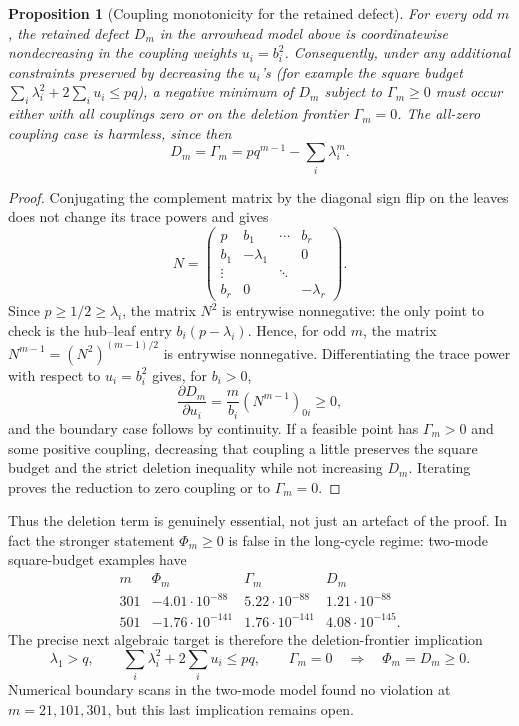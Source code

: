 \documentclass[11pt]{article}
\newtheorem{proposition}[theorem]{Proposition}
\begin{document}
\begin{proposition}[Coupling monotonicity for the retained defect]\label{prop:retained-monotone}
For every odd $m$, the retained defect $D_m$ in the arrowhead model above is coordinatewise nondecreasing in the coupling weights $u_i=b_i^2$.  Consequently, under any additional constraints preserved by decreasing the $u_i$'s (for example the square budget $\sum_i\lambda_i^2+2\sum_i u_i\le pq$), a negative minimum of $D_m$ subject to $\Gamma_m\ge0$ must occur either with all couplings zero or on the deletion frontier $\Gamma_m=0$.  The all-zero coupling case is harmless, since then
\[
        D_m=\Gamma_m=pq^{m-1}-\sum_i\lambda_i^m .
\]
\end{proposition}

\begin{proof}
Conjugating the complement matrix by the diagonal sign flip on the leaves does not change its trace powers and gives
\[
        N=
        \begin{pmatrix}
        p&b_1&\cdots&b_r\\
        b_1&-\lambda_1&&0\\
        \vdots&&\ddots&\\
        b_r&0&&-\lambda_r
        \end{pmatrix}.
\]
Since $p\ge1/2\ge\lambda_i$, the matrix $N^2$ is entrywise nonnegative: the only point to check is the hub--leaf entry $b_i(p-\lambda_i)$.  Hence, for odd $m$, the matrix $N^{m-1}=(N^2)^{(m-1)/2}$ is entrywise nonnegative.  Differentiating the trace power with respect to $u_i=b_i^2$ gives, for $b_i>0$,
\[
        \frac{\partial D_m}{\partial u_i}
        =\frac{m}{b_i}(N^{m-1})_{0i}\ge0,
\]
and the boundary case follows by continuity.  If a feasible point has $\Gamma_m>0$ and some positive coupling, decreasing that coupling a little preserves the square budget and the strict deletion inequality while not increasing $D_m$.  Iterating proves the reduction to zero coupling or to $\Gamma_m=0$.
\end{proof}

Thus the deletion term is genuinely essential, not just an artefact of the proof.  In fact the stronger statement $\Phi_m\ge0$ is false in the long-cycle regime: two-mode square-budget examples have
\[
\begin{array}{c|c|c|c}
m&\Phi_m&\Gamma_m&D_m\\ \hline
301&-4.01\cdot10^{-88}&5.22\cdot10^{-88}&1.21\cdot10^{-88}\\
501&-1.76\cdot10^{-141}&1.76\cdot10^{-141}&4.08\cdot10^{-145}.
\end{array}
\]
The precise next algebraic target is therefore the deletion-frontier implication
\[
        \lambda_1>q,\qquad \sum_i\lambda_i^2+2\sum_i u_i\le pq,\qquad
        \Gamma_m=0
        \quad\Longrightarrow\quad
        \Phi_m=D_m\ge0.
\]
Numerical boundary scans in the two-mode model found no violation at $m=21,101,301$, but this last implication remains open.
\end{document}
